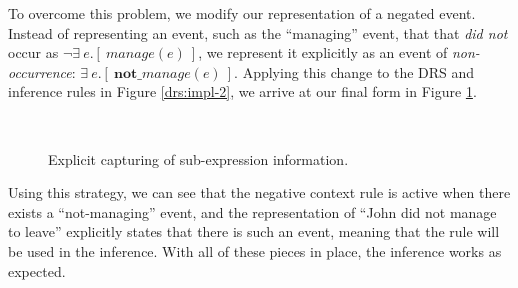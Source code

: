 To overcome this problem, we modify our representation of a negated event. 
Instead of representing an event, such as the ``managing'' event, that that
{\it did not} occur as $\lnot \exists~ e.[~ manage(e) ~]$, we represent it
explicitly as an event of {\it non-occurrence}: $\exists~ e.[~
\textbf{not\_}manage(e) ~]$.  Applying this change to the DRS and inference
rules in Figure \ref{drs:impl-2}, we arrive at our final form in Figure
\ref{drs:impl-3}.

\begin{figure}
  \centering
  ~~~~~~~~~
  \caption{Explicit capturing of sub-expression information.}
  \label{drs:impl-3}
\end{figure}

Using this strategy, we can see that the negative context rule is active when
there exists a ``not-managing'' event, and the representation of ``John did
not manage to leave'' explicitly states that there is such an event, meaning
that the rule will be used in the inference.  With all of these pieces in place,
the inference works as expected.

